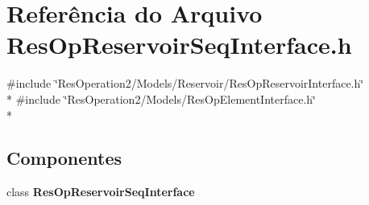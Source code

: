 \section{Referência do Arquivo Res\+Op\+Reservoir\+Seq\+Interface.\+h}
\label{_res_op_reservoir_seq_interface_8h}
{\ttfamily \#include \char`\"{}Res\+Operation2/\+Models/\+Reservoir/\+Res\+Op\+Reservoir\+Interface.\+h\char`\"{}}\\*
{\ttfamily \#include \char`\"{}Res\+Operation2/\+Models/\+Res\+Op\+Element\+Interface.\+h\char`\"{}}\\*
\subsection*{Componentes}
\begin{DoxyCompactItemize}
\item 
class {\bf Res\+Op\+Reservoir\+Seq\+Interface}
\end{DoxyCompactItemize}
